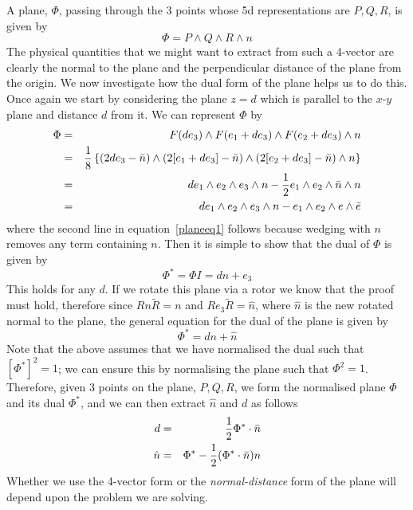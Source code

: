 A plane, $\Phi$, passing through the 3 points whose 5d
representations are $P,Q,R$, is given by
%
\[ \Phi = P\wedge Q \wedge R \wedge n  \]
%
The physical quantities that we might want to extract
from such a 4-vector are clearly the normal to the plane
and the perpendicular distance of the plane from the
origin. We now investigate how the dual form of the plane
helps us to do this. Once again we start by considering
the plane $z=d$ which is parallel to the $x$-$y$ plane
and distance $d$ from it. We can represent $\Phi$ by
%
\begin{eqnarray}
\Phi &  =  &  F(de_3)\wedge F(e_1 + de_3) \wedge
F(e_2+de_3)\wedge n \nonumber \\
     &  =  & \frac{1}{8} \left\{ (2de_3-\bar{n})\wedge
     (2[e_1+de_3]-\bar{n})\wedge (2[e_2+de_3]-\bar{n})\wedge
     n\right\}  \nonumber \\
     &  =  &  de_1\wedge e_2 \wedge e_3\wedge n - \frac{1}{2} e_1\wedge
     e_2\wedge \bar{n}\wedge n \nonumber \\
     &  =  & de_1\wedge e_2 \wedge e_3\wedge n - e_1\wedge
     e_2\wedge e\wedge \bar{e}
     \label{planeeq1}
\end{eqnarray}
%
where the second line in equation~\ref{planeeq1} follows
because wedging with $n$ removes any term containing $n$.
Then it is simple to show that the dual of $\Phi$ is
given by
%
\begin{equation}
\Phi^* = \Phi I=  dn + e_3
\end{equation}
%
This holds for any $d$. If we rotate this plane via a
rotor we know that the proof must hold, therefore
since $Rn\tilde{R}=n$ and $Re_3\tilde{R}=\hat{n}$,
where $\hat{n}$ is the new rotated normal to the plane,
the general equation for the dual of the plane is given
by
%
\begin{equation}
\Phi^* = dn + \hat{n}
\end{equation}
%
Note that the above assumes that we have normalised the
dual such that $[\Phi^*]^2=1$; we can ensure this by
normalising the plane such that $\Phi^2 = 1$. Therefore,
given 3 points on the plane, $P,Q,R$, we form the
normalised plane $\Phi$ and its dual $\Phi^*$, and we can
then extract $\hat{n}$ and $d$ as follows
%
\begin{eqnarray}
 d  & = &  \frac{1}{2} \Phi^*\cdot \bar{n} \\
   \hat{n} &  = &  \Phi^* - \frac{1}{2} (\Phi^*\cdot\bar{n})n
\end{eqnarray}
%
Whether we use the 4-vector form or the  \emph{normal-distance} 
form of the plane will depend upon the
problem we are solving.


